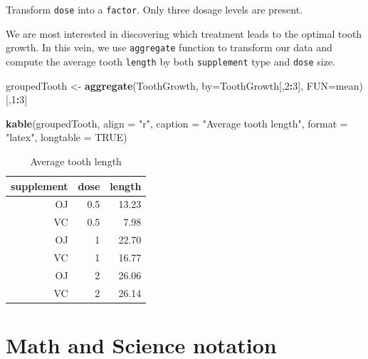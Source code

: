 \documentclass[12pt,oneside]{chicagocapstone}
\newenvironment{Shaded}{\begin{snugshade}}{\end{snugshade}}
\newcommand{\KeywordTok}[1]{\textcolor[rgb]{0.13,0.29,0.53}{\textbf{#1}}}
\newcommand{\DataTypeTok}[1]{\textcolor[rgb]{0.13,0.29,0.53}{#1}}
\newcommand{\DecValTok}[1]{\textcolor[rgb]{0.00,0.00,0.81}{#1}}
\newcommand{\StringTok}[1]{\textcolor[rgb]{0.31,0.60,0.02}{#1}}
\newcommand{\OtherTok}[1]{\textcolor[rgb]{0.56,0.35,0.01}{#1}}
\newcommand{\OperatorTok}[1]{\textcolor[rgb]{0.81,0.36,0.00}{\textbf{#1}}}
\newcommand{\NormalTok}[1]{#1}
\begin{document}
Transform \texttt{dose} into a \texttt{factor}. Only three dosage levels
are present.
\begin{Shaded}
\end{Shaded}
We are most interested in discovering which treatment leads to the
optimal tooth growth. In this vein, we use \texttt{aggregate} function
to transform our data and compute the average tooth \texttt{length} by
both \texttt{supplement} type and \texttt{dose} size.
\begin{Shaded}
\begin{Highlighting}[]
\NormalTok{groupedTooth <-}\StringTok{ }\KeywordTok{aggregate}\NormalTok{(ToothGrowth, }\DataTypeTok{by=}\NormalTok{ToothGrowth[,}\DecValTok{2}\OperatorTok{:}\DecValTok{3}\NormalTok{], }\DataTypeTok{FUN=}\NormalTok{mean)[,}\DecValTok{1}\OperatorTok{:}\DecValTok{3}\NormalTok{]}

\KeywordTok{kable}\NormalTok{(groupedTooth, }\DataTypeTok{align =} \StringTok{"r"}\NormalTok{, }\DataTypeTok{caption =} \StringTok{"Average tooth length"}\NormalTok{,}
      \DataTypeTok{format =} \StringTok{"latex"}\NormalTok{, }\DataTypeTok{longtable =} \OtherTok{TRUE}\NormalTok{)}
\end{Highlighting}
\end{Shaded}
\begin{longtable}{r|r|r}
\caption{\label{tab:group}Average tooth length}\\
\hline
supplement & dose & length\\
\hline
OJ & 0.5 & 13.23\\
\hline
VC & 0.5 & 7.98\\
\hline
OJ & 1 & 22.70\\
\hline
VC & 1 & 16.77\\
\hline
OJ & 2 & 26.06\\
\hline
VC & 2 & 26.14\\
\hline
\end{longtable}
\newpage

\section*{Math and Science notation}\label{math-sci}
\end{document}
